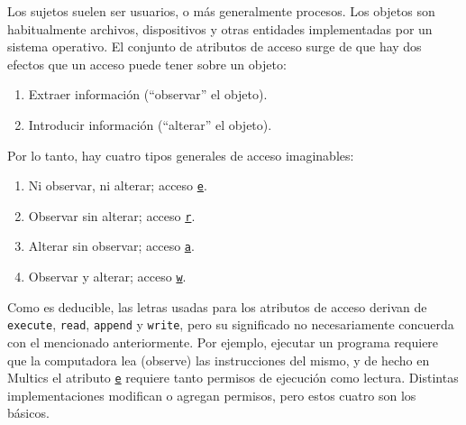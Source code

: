 \documentclass{article}
\theoremstyle{definition}
\begin{document}
Los sujetos suelen ser usuarios, o más generalmente procesos. Los objetos son
habitualmente archivos, dispositivos y otras entidades implementadas por un
sistema operativo.
El conjunto de atributos de acceso surge de que hay dos efectos que un acceso
puede tener sobre un objeto:
\begin{enumerate}
\itemsep0em 
  \item Extraer información (``observar'' el objeto).
  \item Introducir información (``alterar'' el objeto).
\end{enumerate}
Por lo tanto, hay cuatro tipos generales de acceso imaginables:
\begin{enumerate}
\itemsep0em 
  \item Ni observar, ni alterar; acceso \texttt{\underline{e}}.
  \item Observar sin alterar; acceso \texttt{\underline{r}}.
  \item Alterar sin observar; acceso \texttt{\underline{a}}.
  \item Observar y alterar; acceso \texttt{\underline{w}}.
\end{enumerate}
Como es deducible, las letras usadas para los atributos de acceso derivan de
\verb+execute+, \verb+read+, \verb+append+ y \verb+write+, pero su significado
no necesariamente concuerda con el mencionado anteriormente. Por ejemplo,
ejecutar un programa requiere que la computadora lea (observe) las instrucciones
del mismo, y de hecho en Multics el atributo \texttt{\underline{e}} requiere
tanto permisos de ejecución como lectura. Distintas implementaciones modifican o
agregan permisos, pero estos cuatro son los básicos.
\end{document}
